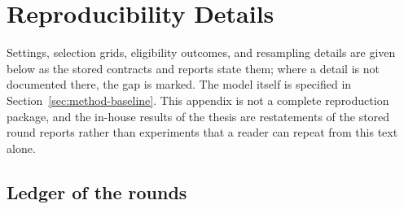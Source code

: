 \chapter{Reproducibility Details}
\label{app:repro}

Settings, selection grids, eligibility outcomes, and resampling details
are given below as the stored contracts and reports state them; where a
detail is not documented there, the gap is marked. The model itself is
specified in Section~\ref{sec:method-baseline}. This appendix is not a
complete reproduction package, and the in-house results of the thesis
are restatements of the stored round reports rather than experiments
that a reader can repeat from this text alone.

\section{Ledger of the rounds}
\label{sec:repro-ledger}

